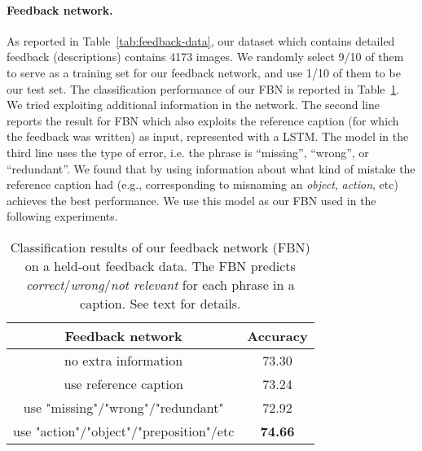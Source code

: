 


\vspace{-2mm}
\paragraph{Feedback network.} As reported in Table~\ref{tab:feedback-data}, our dataset which contains detailed feedback (descriptions) contains 4173 images. We randomly select 9/10 of them to serve as a training set for our feedback network, and use 1/10 of them to be our test set. The classification performance of our FBN is reported in Table~\ref{feedback-table}. %
We tried exploiting additional information in the network. The second line reports the result for FBN which also exploits the reference caption (for which the feedback was written) as input, represented with a LSTM. The model in the third line uses the type of error, i.e. the phrase is ``missing'', ``wrong'', or ``redundant''. 
We found that by using  information about what kind of mistake the reference caption had (e.g., corresponding to misnaming an \emph{object}, \emph{action}, etc) achieves the best performance. We use this model as our FBN used in the following experiments. 

\begin{table}[t!]
\vspace{-1mm}
  \centering
  \small
  \begin{minipage}{0.5\linewidth}
  \begin{tabular}{cc}
    \toprule
     Feedback network & Accuracy\\
     \hline
    no extra information & 73.30 \\
    use reference caption & 73.24 \\
    use "missing"/"wrong"/"redundant"  &72.92 \\
    use  "action"/"object"/"preposition"/etc &{\bf 74.66} \\
    \bottomrule
  \end{tabular}
  \end{minipage}
  \hspace{3mm}
  \begin{minipage}{0.45\linewidth}
    \caption{\small Classification results of our feedback network (FBN) on a held-out feedback data. The FBN predicts \emph{correct}/\emph{wrong}/\emph{not relevant} for each phrase in a caption. See text for details.}
  \label{feedback-table}
   \end{minipage}
   \vspace{-2mm}
\end{table}

